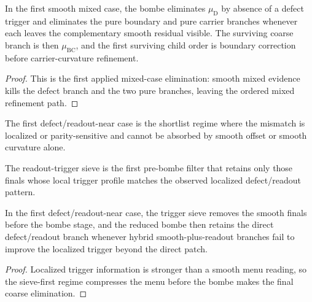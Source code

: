 \begin{proposition}
\label{prop:first-bombe-reduction-in-the-smooth-mixed-optical-case}
In the first smooth mixed case, the bombe eliminates $\mu_{\mathrm D}$ by absence of a defect trigger and eliminates the pure boundary and pure carrier branches whenever each leaves the complementary smooth residual visible. The surviving coarse branch is then $\mu_{\mathrm{BC}}$, and the first surviving child order is boundary correction before carrier-curvature refinement.
\end{proposition}

\begin{proof}
This is the first applied mixed-case elimination: smooth mixed evidence kills the defect branch and the two pure branches, leaving the ordered mixed refinement path.
\end{proof}

\begin{definition}
\label{def:first-defect-readout-near-shortlist-case}
The first defect/readout-near case is the shortlist regime where the mismatch is localized or parity-sensitive and cannot be absorbed by smooth offset or smooth curvature alone.
\end{definition}

\begin{definition}
\label{def:readout-trigger-sieve}
The readout-trigger sieve is the first pre-bombe filter that retains only those finals whose local trigger profile matches the observed localized defect/readout pattern.
\end{definition}

\begin{proposition}
\label{prop:first-trigger-sieve-plus-bombe-reduction-in-the-defect-readout-near-optical-case}
In the first defect/readout-near case, the trigger sieve removes the smooth finals before the bombe stage, and the reduced bombe then retains the direct defect/readout branch whenever hybrid smooth-plus-readout branches fail to improve the localized trigger beyond the direct patch.
\end{proposition}

\begin{proof}
Localized trigger information is stronger than a smooth menu reading, so the sieve-first regime compresses the menu before the bombe makes the final coarse elimination.
\end{proof}

